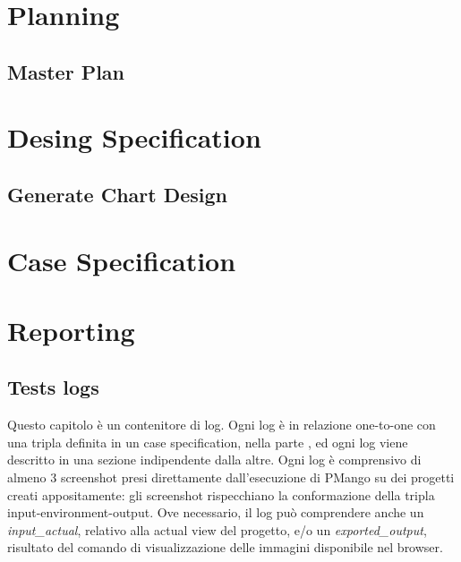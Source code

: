 \documentclass[a4paper, 12pt]{report}
\begin{document}
\tableofcontents

\part{Planning}

\chapter{Master Plan}
\label{chap:master_plan}


\part{Desing Specification}
\label{part:DesignSpecification}
\chapter{Generate Chart Design}
\label{chap:generateChartDesingSpecification}


\part{Case Specification}
\label{part:CaseSpecification}




\part{Reporting}
\label{part:reporting}


\chapter{Tests logs}
\label{chap:testsLogs}
Questo capitolo \`e un contenitore di log. Ogni log \`e in relazione one-to-one
con una tripla definita in un case specification, nella parte
\ref{part:CaseSpecification}, ed ogni log viene descritto in una sezione
indipendente dalla altre.
Ogni log \`e comprensivo di almeno 3 screenshot presi direttamente dall'esecuzione di PMango
su dei progetti creati appositamente: gli screenshot rispecchiano la conformazione della tripla input-environment-output.
Ove necessario, il log pu\`o comprendere anche un \emph{input\_actual}, relativo alla actual view del progetto, e/o un \emph{exported\_output}, risultato del comando di visualizzazione delle immagini disponibile nel browser.

%


\end{document}
